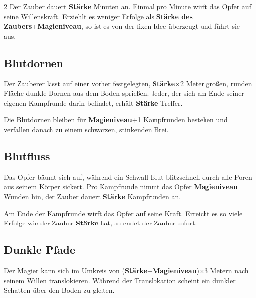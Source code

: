\begin{multicols*}{2}
Der Zauber dauert \textbf{Stärke} Minuten an. Einmal pro Minute wirft das Opfer auf seine Willenskraft. Erziehlt es weniger Erfolge als  \textbf{Stärke des Zaubers}+\textbf{Magieniveau}, so ist es von der fixen Idee überzeugt und führt sie aus.



\subsection{Blutdornen}

Der Zauberer lässt auf einer vorher festgelegten, \textbf{Stärke}×2 Meter großen, runden Fläche dunkle Dornen aus dem Boden sprießen. Jeder, der sich am Ende seiner eigenen Kampfrunde darin befindet, erhält  \textbf{Stärke} Treffer.

Die Blutdornen bleiben für \textbf{Magieniveau}+1 Kampfrunden bestehen und verfallen danach zu einem schwarzen, stinkenden Brei.



\subsection{Blutfluss}

Das Opfer bäumt sich auf, während ein Schwall Blut blitzschnell durch alle Poren aus seinem Körper sickert. Pro Kampfrunde nimmt das Opfer \textbf{Magieniveau} Wunden hin, der Zauber dauert \textbf{Stärke} Kampfrunden an.

Am Ende der Kampfrunde wirft das Opfer auf seine Kraft. Erreicht es so viele Erfolge wie der Zauber \textbf{Stärke} hat, so endet der Zauber sofort.



\subsection{Dunkle Pfade}

Der Magier kann sich im Umkreis von (\textbf{Stärke}+\textbf{Magieniveau})×3 Metern nach seinem Willen translokieren. Während der Translokation scheint ein dunkler Schatten über den Boden zu gleiten.


\end{multicols*}
